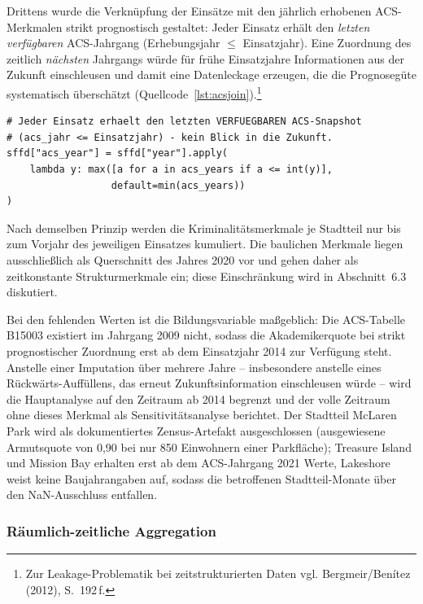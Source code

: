 Drittens wurde die Verknüpfung der Einsätze mit den jährlich erhobenen
ACS-Merkmalen strikt prognostisch gestaltet: Jeder Einsatz erhält den
\emph{letzten verfügbaren} ACS-Jahrgang (Erhebungsjahr $\leq$ Einsatzjahr).
Eine Zuordnung des zeitlich \emph{nächsten} Jahrgangs würde für frühe
Einsatzjahre Informationen aus der Zukunft einschleusen und damit eine
Datenleckage erzeugen, die die Prognosegüte systematisch überschätzt
(Quellcode~\ref{lst:acsjoin}).\footnote{Zur Leakage-Problematik bei
zeitstrukturierten Daten vgl. Bergmeir/Benítez (2012), S.~192\,f.}

\begin{lstlisting}[caption={Strikt prognostische Zuordnung des
ACS-Jahrgangs (Ausschnitt aus \texttt{pipeline/02\_join.py})},
label=lst:acsjoin]
# Jeder Einsatz erhaelt den letzten VERFUEGBAREN ACS-Snapshot
# (acs_jahr <= Einsatzjahr) - kein Blick in die Zukunft.
sffd["acs_year"] = sffd["year"].apply(
    lambda y: max([a for a in acs_years if a <= int(y)],
                  default=min(acs_years))
)
\end{lstlisting}

Nach demselben Prinzip werden die Kriminalitätsmerkmale je Stadtteil nur bis
zum Vorjahr des jeweiligen Einsatzes kumuliert. Die baulichen Merkmale liegen
ausschließlich als Querschnitt des Jahres 2020 vor und gehen daher als
zeitkonstante Strukturmerkmale ein; diese Einschränkung wird in
Abschnitt~6.3 diskutiert.

Bei den fehlenden Werten ist die Bildungsvariable maßgeblich: Die
ACS-Tabelle B15003 existiert im Jahrgang 2009 nicht, sodass die
Akademikerquote bei strikt prognostischer Zuordnung erst ab dem Einsatzjahr
2014 zur Verfügung steht. Anstelle einer Imputation über mehrere Jahre --
insbesondere anstelle eines Rückwärts-Auffüllens, das erneut
Zukunftsinformation einschleusen würde -- wird die Hauptanalyse auf den
Zeitraum ab 2014 begrenzt und der volle Zeitraum ohne dieses Merkmal als
Sensitivitätsanalyse berichtet. Der Stadtteil McLaren Park wird als
dokumentiertes Zensus-Artefakt ausgeschlossen (ausgewiesene Armutsquote von
0,90 bei nur 850 Einwohnern einer Parkfläche); Treasure Island und Mission
Bay erhalten erst ab dem ACS-Jahrgang 2021 Werte, Lakeshore weist keine
Baujahrangaben auf, sodass die betroffenen Stadtteil-Monate über den
NaN-Ausschluss entfallen.

\subsubsection{Räumlich-zeitliche Aggregation}
\label{sec:aggregation}

